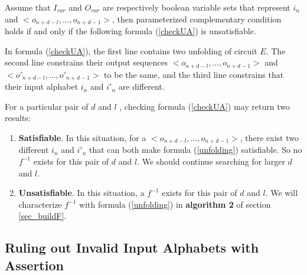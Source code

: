 \documentclass[journal]{IEEEtran}
\begin{document}
Assume that $I_{var}$ and $O_{var}$ are respectively boolean variable sets that represent $i_n$ and $<o_{n+d-l},\dots , o_{n+d-1} >$,
then parameterized complementary condition holds if and only if the following formula (\ref{checkUA}) is unsatisfiable.
\begin{equation}\label{checkUA}
\end{equation}

In formula (\ref{checkUA}),
the first line contains two unfolding of circuit $E$.
The second line constrains their output sequences $<o_{n+d-l},\dots , o_{n+d-1} >$ and $<o'_{n+d-l},\dots , o'_{n+d-1} >$ to be the same,
and the third line constrains that their input alphabet $i_n$ and $i'_n$ are different.

For a particular pair of $d$ and $l$ , checking formula (\ref{checkUA}) may return two results:
\begin{enumerate}
\item \textbf{Satisfiable}. In this situation,
      for a $<o_{n+d-l},\dots , o_{n+d-1} >$,
      there exist two different $i_n$ and $i'_n$ that can both make formula (\ref{unfolding}) satisfiable.
      So no $f^{-1}$ exists for this pair of $d$ and $l$.
      We should continue searching for larger $d$ and $l$.
\item \textbf{Unsatisfiable}. In this situation,
      a $f^{-1}$ exists for this pair of $d$ and $l$.
      We will characterize $f^{-1}$ with formula (\ref{unfolding}) in \textbf{algorithm 2} of section \ref{sec_buildF}.
\end{enumerate}


\subsection{Ruling out Invalid Input Alphabets with Assertion}\label{subsec_AST}
\end{document}

